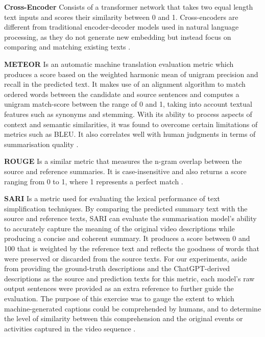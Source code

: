 \textbf{Cross-Encoder} Consists of a transformer network that takes two equal length text inputs and scores their similarity between 0 and 1. Cross-encoders are different from traditional encoder-decoder models used in natural language processing, as they do not generate new embedding but instead focus on comparing and matching existing texts \cite{crossencoder}.

\textbf{METEOR} Is an automatic machine translation evaluation metric which produces a score based on the weighted harmonic mean of unigram precision and recall in the predicted text. It makes use of an alignment algorithm to match ordered words between the candidate and source sentences and computes a unigram match-score between the range of 0 and 1, taking into account textual features such as synonyms and stemming. With its ability to process aspects of context and semantic similarities, it was found to overcome certain limitations of metrics such as BLEU. It also correlates well with human judgments in terms of summarisation quality \cite{meteor}.

\textbf{ROUGE} Is a similar metric that measures the n-gram overlap between the source and reference summaries. It is case-insensitive and also returns a score ranging from 0 to 1, where 1 represents a perfect match \cite{rogue}.

\textbf{SARI} Is a metric used for evaluating the lexical performance of text simplification techniques. By comparing the predicted summary text with the source and reference texts, SARI can evaluate the summarisation model's ability to accurately capture the meaning of the original video descriptions while producing a concise and coherent summary. It produces a score between 0 and 100 that is weighted by the reference text and reflects the goodness of words that were preserved or discarded from the source texts. For our experiments, aside from providing the ground-truth descriptions and the ChatGPT-derived descriptions as the source and prediction texts for this metric, each model's raw output sentences were provided as an extra reference to further guide the evaluation. The purpose of this exercise was to gauge the extent to which machine-generated captions could be comprehended by humans, and to determine the level of similarity between this comprehension and the original events or activities captured in the video sequence \cite{sari}.

\begin{table}[h]
  \centering
  \label{sofapainting}
\end{table}

